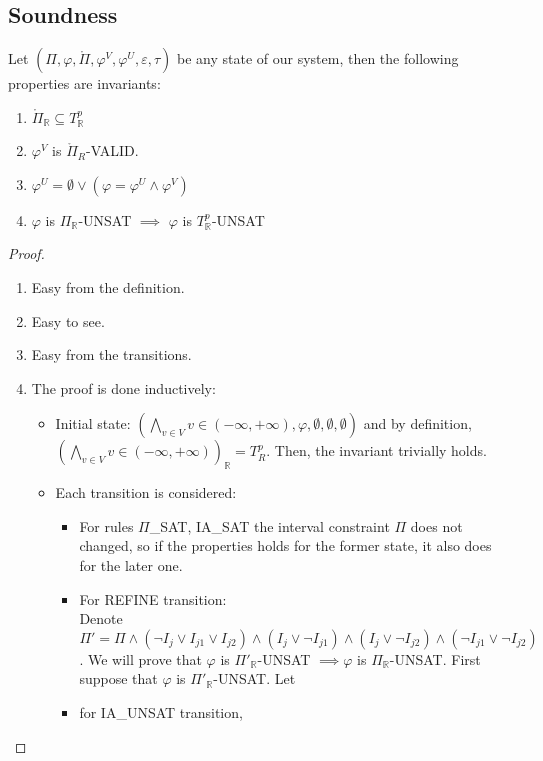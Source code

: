 \subsection{Soundness}
\begin{theorem}
Let $(\Pi, \varphi, \mathring{\Pi}, \varphi^V, \varphi^U, \varepsilon, \tau)$ be any state of our system, then the following properties are invariants:
\begin{enumerate}
\item $\mathring{\Pi}_\mathbb{R} \subseteq T^p_\mathbb{R}$
\item $\varphi^V$ is $\mathring{\Pi}_{R}$-VALID.
\item $\varphi^U = \emptyset \vee (\varphi = \varphi^U \wedge \varphi^V)$
\item $\varphi$ is $\Pi_\mathbb{R}$-UNSAT $\implies$ $\varphi$ is $T^p_\mathbb{R}$-UNSAT
\end{enumerate}
\end{theorem}

\begin{proof}
\begin{enumerate}
\item Easy from the definition.
\item Easy to see.
\item Easy from the transitions.
\item The proof is done inductively:
\begin{itemize}
\item \sloppy Initial state: $(\bigwedge\limits_{v \in V}v \in (-\infty, +\infty), \varphi, \emptyset, \emptyset, \emptyset)$ and by definition, ${(\bigwedge\limits_{v \in V}v \in (-\infty, +\infty))_\mathbb{R} = T^p_R}$. Then, the invariant trivially holds.
\item Each transition is considered:
\begin{itemize}
\item For rules $\Pi$\_SAT, IA\_SAT the interval constraint $\Pi$ does not changed, so if the properties holds for the former state, it also does for the later one.
\item \sloppy For REFINE transition: \\ Denote ${\Pi' = \Pi \wedge (\neg I_j \vee I_{j1} \vee I_{j2}) \wedge (I_j \vee \neg I_{j1}) \wedge (I_j \vee \neg I_{j2}) \wedge (\neg I_{j1} \vee \neg I_{j2})}$. We will prove that $\varphi$ is $\Pi'_\mathbb{R}$-UNSAT $\implies \varphi$ is $\Pi_\mathbb{R}$-UNSAT. First suppose that $\varphi$ is $\Pi'_\mathbb{R}$-UNSAT. Let
\item for IA\_UNSAT transition, 
\end{itemize}
\end{itemize}
\end{enumerate}
\end{proof}

